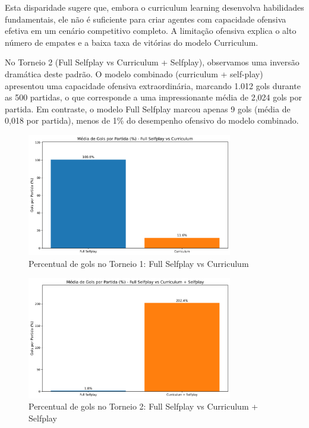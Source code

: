 Esta disparidade sugere que, embora o curriculum learning desenvolva habilidades fundamentais, ele não é suficiente para criar agentes com capacidade ofensiva efetiva em um cenário competitivo completo. A limitação ofensiva explica o alto número de empates e a baixa taxa de vitórias do modelo Curriculum.

No Torneio 2 (Full Selfplay vs Curriculum + Selfplay), observamos uma inversão dramática deste padrão. O modelo combinado (curriculum + self-play) apresentou uma capacidade ofensiva extraordinária, marcando 1.012 gols durante as 500 partidas, o que corresponde a uma impressionante média de 2,024 gols por partida. Em contraste, o modelo Full Selfplay marcou apenas 9 gols (média de 0,018 por partida), menos de 1\% do desempenho ofensivo do modelo combinado.

\begin{figure}[H]
    \centering
    \includegraphics[width=0.8\textwidth]{fig/graficos_trabalho/graficos_torneios/torneios/percentual_gols_full_selfplay_vs_curriculum.png}
    \caption{Percentual de gols no Torneio 1: Full Selfplay vs Curriculum}
    \label{fig:percentual_gols_torneio1}
\end{figure}

\begin{figure}[H]
    \centering
    \includegraphics[width=0.8\textwidth]{fig/graficos_trabalho/graficos_torneios/torneios/percentual_gols_full_selfplay_vs_curriculum_+_selfplay.png}
    \caption{Percentual de gols no Torneio 2: Full Selfplay vs Curriculum + Selfplay}
    \label{fig:percentual_gols_torneio2}
\end{figure}

